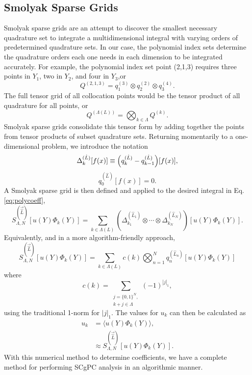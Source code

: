 \subsection{Smolyak Sparse Grids}
Smolyak sparse grids \cite{smolyak} are an attempt to discover the smallest necessary quadrature set to
integrate a multidimensional integral with varying orders of predetermined quadrature sets.  In our case, the
polynomial index sets determine the quadrature orders each one needs in each dimension to be integrated
accurately.  For example, the polynomial index set point (2,1,3) requires three points in $Y_1$, two in $Y_2$,
and four in $Y_3$,or
\begin{equation}
  Q^{(2,1,3)} = q^{(3)}_1 \otimes q^{(2)}_2 \otimes q^{(4)}_3.
\end{equation}
The full tensor grid of all collocation points would be the tensor product of all quadrature for all points,
or
\begin{equation}
  Q^{(\Lambda(L))} = \bigotimes_{k\in\Lambda}Q^{(k)}.
\end{equation}
Smolyak sparse grids consolidate this tensor form by adding together the points from tensor products of subset
quadrature sets.  Returning momentarily to a one-dimensional problem, we introduce the notation \cite{sparse1}
\begin{equation}
  \Delta_k^{(\hat L)}[f(x)] \equiv \qty(q_k^{(\hat L)} - q_{k-1}^{(\hat L)})[f(x)],
\end{equation}
\begin{equation}
  q_0^{(\hat L)}[f(x)] = 0.
\end{equation}
A Smolyak sparse grid is then defined and applied to the desired integral in Eq. \ref{eq:polycoeff},
\begin{equation}
  S^{(\vec{\hat L})}_{\Lambda,N}[u(Y)\Phi_k(Y)] = \sum_{k\in\Lambda(L)} \left(\Delta_{k_1}^{(\hat L_1)} \otimes \cdots \otimes
  \Delta_{k_N}^{(\hat L_N)}\right)[u(Y)\Phi_k(Y)].
\end{equation}
Equivalently, and in a more algorithm-friendly approach,
\begin{equation}
  S^{(\vec{\hat L})}_{\Lambda,N}[u(Y)\Phi_k(Y)] = \sum_{k\in\Lambda(L)} c(k)\bigotimes_{n=1}^N
  q^{(\hat L_n)}_n[u(Y)\Phi_k(Y)]
\end{equation}
where
\begin{equation}
  c(k) = \sum_{\substack{j=\{0,1\}^N,\\k+j\in\Lambda}} (-1)^{|j|_1},
\end{equation}
using the traditional 1-norm for $|j|_1$.
The values for $u_k$ can then be calculated as
\begin{align}
  u_k &= \langle u(Y)\Phi_k(Y) \rangle,\\
      &\approx S^{(\vec{\hat L})}_{\Lambda,N}[u(Y)\Phi_k(Y)].
\end{align}
With this numerical method to determine coefficients, we have a complete method for performing SCgPC
analysis in an algorithmic manner.

